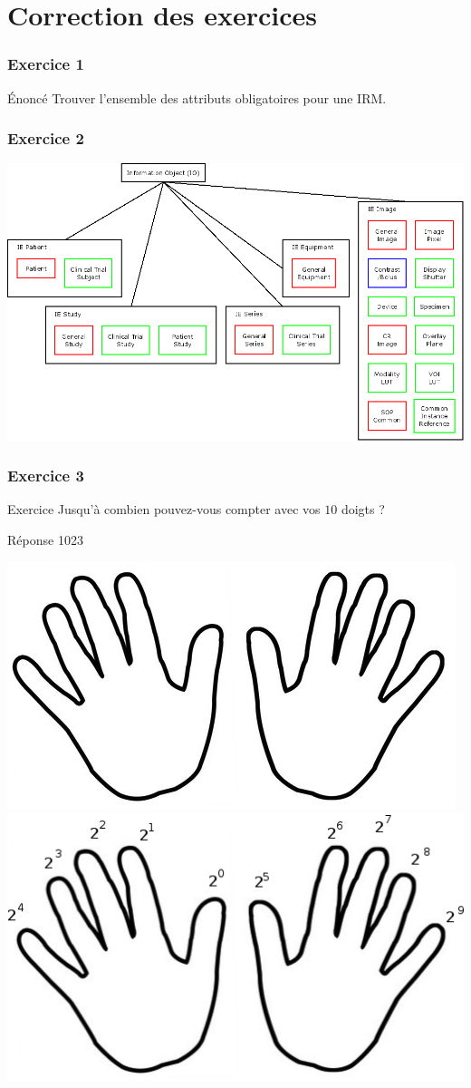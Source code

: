 \section{Correction des exercices}

\frame
{
    \frametitle{Exercice 1}
	\begin{block}{\'Enonc\'e}
		Trouver l'ensemble des attributs obligatoires pour une IRM.
	\end{block}
}

\frame
{
    \frametitle{Exercice 2}
    \includegraphics[width=\linewidth]{./figures/IO-definition-IE.png}

}

\frame
{
    \frametitle{Exercice 3}

    \begin{block}{Exercice}
        Jusqu'\`a combien pouvez-vous compter avec vos $10$ doigts ?
    \end{block}

    \begin{block}{R\'eponse}
        1023
    \end{block}

    \begin{center}
        \includegraphics[width=.5\linewidth]{./figures/mains.png}
        \includegraphics[width=.5\linewidth]{./figures/digits.png}
    \end{center}

}


